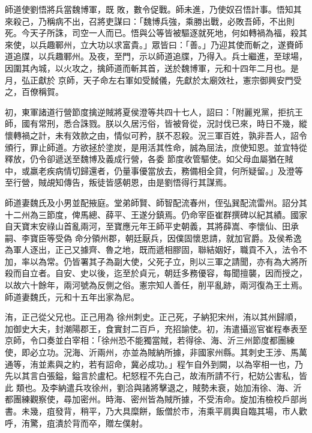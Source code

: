 \begin{pinyinscope}
 師道使劉悟將兵當魏博軍，既
 敗，數令促戰。師未進，乃使奴召悟計事。悟知其來殺己，乃稱病不出，召將吏謀曰：「魏博兵強，乘勝出戰，必敗吾師，不出則死。今天子所誅，司空一人而已。悟與公等皆被驅逐就死地，何如轉禍為福，殺其來使，以兵趣鄆州，立大功以求富貴。」眾皆曰：「善。」乃迎其使而斬之，遂賚師道追牒，以兵趣鄆州。及夜，至門，示以師道追牒，乃得入。兵士繼進，至球場，因圍其內城，以火攻之，擒師道而斬其首，送於魏博軍，元和十四年二月也。是月，弘正獻於
 京師，天子命左右軍如受馘儀，先獻於太廟效社，憲宗御興安門受之，百僚稱賀。



 初，東軍諸道行營節度擒逆賊將夏侯澄等共四十七人，詔曰：「附麗兇黨，拒抗王師，國有常刑，悉合誅戮。朕以久居污俗，皆被脅從，況討伐已來，時日不幾，縱懷轉禍之計，未有效款之由，情似可矜，朕不忍殺。況三軍百姓，孰非吾人，詔令頒行，罪止師道。方欲拯於塗炭，是用活其性命，誠為屈法，庶使知恩。並宜特從釋放，仍令卻遞送至魏博及義成行營，各委
 節度收管驅使。如父母血屬猶在賊中，或羸老疾病情切歸還者，仍量事優當放去，務備相全貸，何所疑留。」及澄等至行營，賊覘知傳告，叛徒皆感朝恩，由是劉悟得行其謀焉。



 師道妻魏氏及小男並配掖庭。堂弟師賢、師智配流春州，侄弘巽配流雷州。詔分其十二州為三節度，俾馬總、薛平、王遂分鎮焉。仍命宰臣崔群撰碑以紀其績。國家自天寶末安祿山首亂兩河，至寶應元年王師平史朝義，其將薛嵩、李懷仙、田承嗣、李寶臣等受偽
 命分領州郡，朝廷厭兵，因僕固懷恩請，就加官爵。及侯希逸為軍人逐出，正己又據齊、魯之地，既而遞相膠固，聯結姻好，職貢不入，法令不加，率以為常。仍皆署其子為副大使，父死子立，則以三軍之請聞，亦有為大將所殺而自立者。自安、史以後，迄至於貞元，朝廷多務優容，每聞擅襲，因而授之，以故六十餘年，兩河號為反側之俗。憲宗知人善任，削平亂跡，兩河復為王土焉。師道妻魏氏，元和十五年出家為尼。



 洧，正己從父兄也。正己用為
 徐州刺史。正己死，子納犯宋州，洧以其州歸順，加御史大夫，封潮陽郡王，食實封二百戶，充招諭使。初，洧遣攝巡官崔程奉表至京師，令口奏並白宰相：「徐州恐不能獨當賊，若得徐、海、沂三州節度都團練使，即必立功。況海、沂兩州，亦並為賊納所據，非國家州縣。其刺史王涉、馬萬通等，洧並素與之約，若有詔命，冀必成功。」程乍自外到闕，以為宰相一也，乃先以其言白張鎰，鎰言於盧杞。杞怒程不先白己，故洧所請不行，杞妨公害私，皆此
 類也。及李納遣兵攻徐州，劉洽與諸將擊退之，賊勢未衰，始加洧徐、海、沂都團練觀察使，尋加密州。時海、密州皆為賊所據，不受洧命。旋加洧檢校戶部尚書。未幾，疽發背，稍平，乃大具糜餅，飯僧於市，洧乘平肩輿自臨其場，市人歡呼，洧驚，疽潰於背而卒，贈左僕射。




\end{pinyinscope}
